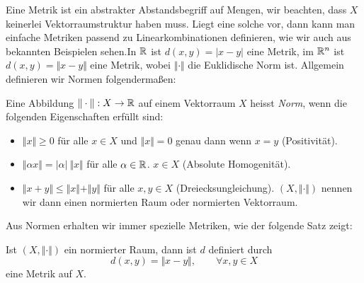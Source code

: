 Eine Metrik ist ein abstrakter Abstandsbegriff auf Mengen, wir beachten, dass \(X\) keinerlei Vektorraumstruktur haben muss.  Liegt eine solche vor, dann kann man einfache Metriken passend zu Linearkombinationen definieren, wie wir auch aus bekannten Beispielen sehen.In \(\mathbb{R}\) ist \(d(x,y) = |x-y|\) eine Metrik, im \(\mathbb{R}^n\) ist \(d(x,y) = \Vert x -y \Vert \) eine Metrik, wobei \(\Vert \cdot \Vert\) die Euklidische Norm ist. Allgemein definieren wir Normen folgendermaßen:
\label{metrik/normen:definition-1}
\begin{definition}{}{}



Eine Abbildung \(\Vert \cdot \Vert:X\rightarrow \mathbb{R}\) auf einem Vektorraum \(X\) heisst \emph{Norm}, wenn die folgenden Eigenschaften erfüllt sind:
\begin{itemize}
\item {} 
\(\Vert x \Vert \geq 0\) für alle \(x \in X\) und \(\Vert x \Vert = 0\) genau dann wenn \(x=y\) (Positivität).

\item {} 
\(\Vert \alpha x \Vert = |\alpha|~\Vert x \Vert\) für alle \(\alpha \in \mathbb{R}\). \(x\in X\)  (Absolute Homogenität).

\item {} 
\(\Vert x+y \Vert \leq\Vert x  \Vert + \Vert y  \Vert\) für alle \(x,y  \in X\)  (Dreiecksungleichung).
\((X,\Vert \cdot \Vert)\)  nennen wir dann einen normierten Raum oder normierten Vektorraum.

\end{itemize}
\end{definition}

Aus Normen erhalten wir immer spezielle Metriken, wie der folgende Satz zeigt:
\label{metrik/normen:theorem-2}
\begin{theorem}{}{}



Ist \((X,\Vert \cdot \Vert)\) ein normierter Raum, dann ist \(d\) definiert durch
\begin{equation*}
 d(x,y) = \Vert x - y \Vert ,\qquad \forall x,y \in X
\end{equation*}
eine Metrik auf \(X\).
\end{theorem}

